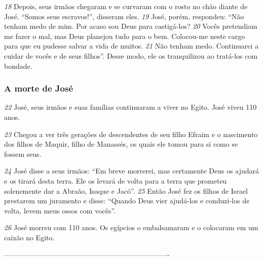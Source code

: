 \bigskip
\textit{\tiny 18}
Depois,
seus irmãos chegaram e se curvaram com o rosto no chão diante de José. “Somos
seus escravos!”, disseram eles.
\textit{\tiny 19}
José, porém, respondeu: “Não tenham medo de mim. Por acaso sou Deus para
castigá-los? 
\textit{\tiny 20}
Vocês pretendiam me fazer o mal, mas Deus planejou tudo para o
bem. Colocou-me neste cargo para que eu pudesse salvar a vida de muitos. 
\textit{\tiny 21}
Não
tenham medo. Continuarei a cuidar de vocês e de seus filhos”. Desse modo, ele os
tranquilizou ao tratá-los com bondade.

\bigskip
\subsubsection*{A morte de José}
\textit{\tiny 22}
José, seus irmãos e suas famílias continuaram a viver no Egito. José viveu 110 anos. 

\bigskip
\textit{\tiny 23}
Chegou a ver três gerações de descendentes de seu filho Efraim e o
nascimento dos filhos de Maquir, filho de Manassés, os quais ele tomou para si
como se fossem seus.

\bigskip
\textit{\tiny 24}
José disse a seus irmãos: “Em breve morrerei, mas certamente Deus os
ajudará e os tirará desta terra. Ele os levará de volta para a terra que prometeu
solenemente dar a Abraão, Isaque e Jacó”.
\textit{\tiny 25}
Então  José fez os filhos de Israel prestarem um juramento e disse: “Quando
Deus vier ajudá-los e conduzi-los de volta, levem meus ossos com vocês”. 

\bigskip
\textit{\tiny 26}
José
morreu com 110
anos. Os egípcios o embalsamaram e o colocaram em um caixão
no Egito.

----------------------------------------------------------------------
